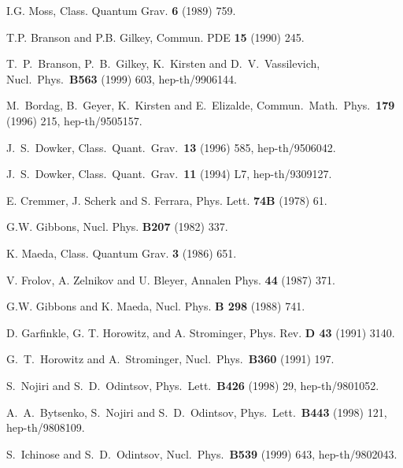 \documentclass[a4paper,12pt]{article}
\begin{document}
\begin{thebibliography}{99}
I.G. Moss, Class. Quantum Grav. {\bf 6} (1989) 759.

T.P. Branson and P.B. Gilkey, Commun. PDE {\bf 15} (1990) 245.

T.~P.~Branson, P.~B.~Gilkey, K.~Kirsten and D.~V.~Vassilevich,
Nucl.\ Phys.\  {\bf B563} (1999) 603, hep-th/9906144. 

M.~Bordag, B.~Geyer, K.~Kirsten and E.~Elizalde,
Commun.\ Math.\ Phys.\  {\bf 179} (1996) 215, hep-th/9505157.  

J.~S.~Dowker,
Class.\ Quant.\ Grav.\  {\bf 13} (1996) 585, hep-th/9506042. 

J.~S.~Dowker,
Class.\ Quant.\ Grav.\  {\bf 11} (1994) L7, hep-th/9309127.  

E. Cremmer, J. Scherk and S. Ferrara, Phys. Lett. {\bf 74B} (1978) 61.

G.W. Gibbons, Nucl. Phys. {\bf B207} (1982) 337.

K. Maeda, Class. Quantum Grav. {\bf 3} (1986) 651.

V. Frolov, A. Zelnikov and U. Bleyer, Annalen Phys. {\bf 44}
(1987) 371.

G.W. Gibbons and K. Maeda, Nucl. Phys. {\bf B 298} (1988) 741.

D. Garfinkle, G. T. Horowitz, and A. Strominger,
Phys. Rev. {\bf D 43} (1991) 3140.

G.~T.~Horowitz and A.~Strominger,
Nucl.\ Phys.\  {\bf B360} (1991) 197.

S.~Nojiri and S.~D.~Odintsov,
Phys.\ Lett.\  {\bf B426} (1998) 29, hep-th/9801052.

A.~A.~Bytsenko, S.~Nojiri and S.~D.~Odintsov,
Phys.\ Lett.\  {\bf B443} (1998) 121, hep-th/9808109.  

S.~Ichinose and S.~D.~Odintsov,
Nucl.\ Phys.\  {\bf B539} (1999) 643, hep-th/9802043.

\end{thebibliography}
\end{document}
